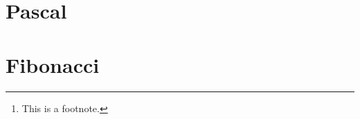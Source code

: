 \documentclass[10pt,a4paper]{article} %
\begin{document}
    \title{\rmfamily\normalfont{}}
    \author{ \\ }
    \date{\today} 
    
    \maketitle
    
    \begin{abstract}
        \noindent\lipsum[1] Just a test.\footnote{This is a footnote.}
    \end{abstract}
       
    \tableofcontents
    
    \section{Pascal}

    
    

    
    

    
    

    \section{Fibonacci}

    
    

    
    
\end{document}
